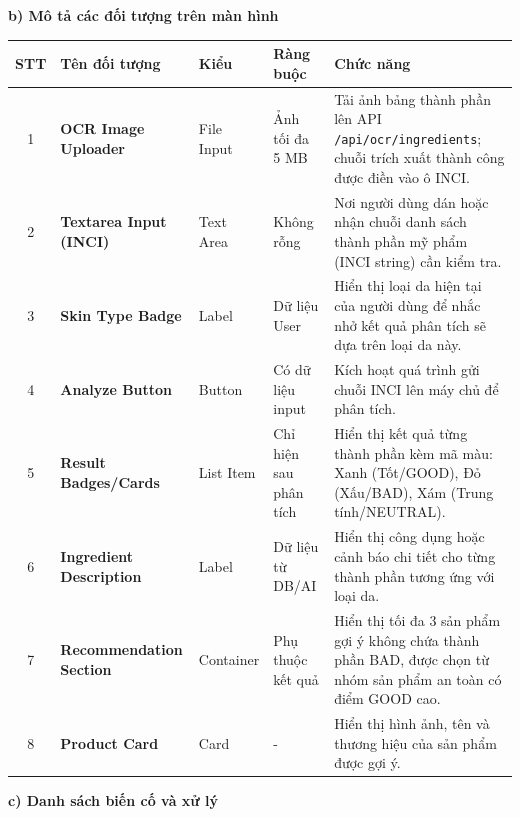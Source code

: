 \documentclass[12pt,a4paper]{article}
\begin{document}
\textbf{b) Mô tả các đối tượng trên màn hình}

\begin{center}
\renewcommand{\arraystretch}{1.5}
\begin{tabularx}{\textwidth}{|c|l|l|l|X|}
\hline
\rowcolor{blue!20}
\textbf{STT} & \textbf{Tên đối tượng} & \textbf{Kiểu} & \textbf{Ràng buộc} & \textbf{Chức năng} \\ \hline

1 & \textbf{OCR Image Uploader} & File Input & Ảnh tối đa 5 MB & Tải ảnh bảng thành phần lên API \texttt{/api/ocr/ingredients}; chuỗi trích xuất thành công được điền vào ô INCI. \\ \hline

2 & \textbf{Textarea Input (INCI)} & Text Area & Không rỗng & Nơi người dùng dán hoặc nhận chuỗi danh sách thành phần mỹ phẩm (INCI string) cần kiểm tra. \\ \hline

3 & \textbf{Skin Type Badge} & Label & Dữ liệu User & Hiển thị loại da hiện tại của người dùng để nhắc nhở kết quả phân tích sẽ dựa trên loại da này. \\ \hline

4 & \textbf{Analyze Button} & Button & Có dữ liệu input & Kích hoạt quá trình gửi chuỗi INCI lên máy chủ để phân tích. \\ \hline

5 & \textbf{Result Badges/Cards} & List Item & Chỉ hiện sau phân tích & Hiển thị kết quả từng thành phần kèm mã màu: Xanh (Tốt/GOOD), Đỏ (Xấu/BAD), Xám (Trung tính/NEUTRAL). \\ \hline

6 & \textbf{Ingredient Description} & Label & Dữ liệu từ DB/AI & Hiển thị công dụng hoặc cảnh báo chi tiết cho từng thành phần tương ứng với loại da. \\ \hline

7 & \textbf{Recommendation Section} & Container & Phụ thuộc kết quả & Hiển thị tối đa 3 sản phẩm gợi ý không chứa thành phần BAD, được chọn từ nhóm sản phẩm an toàn có điểm GOOD cao. \\ \hline

8 & \textbf{Product Card} & Card & - & Hiển thị hình ảnh, tên và thương hiệu của sản phẩm được gợi ý. \\ \hline

\end{tabularx}
\end{center}

\textbf{c) Danh sách biến cố và xử lý}
\end{document}
